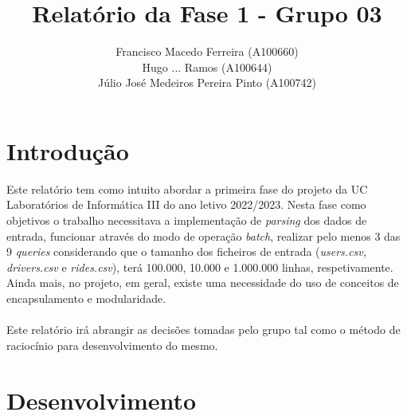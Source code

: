 \documentclass{article}
\title{Relatório da Fase 1 - Grupo 03}
\author{Francisco Macedo Ferreira (A100660)\\Hugo ... Ramos (A100644)\\Júlio José Medeiros Pereira Pinto (A100742)}
\begin{document}
    \maketitle

    \section{Introdução}

    Este relatório tem como intuito abordar a primeira fase do projeto da UC Laboratórios 
    de Informática III do ano letivo 2022/2023.
    Nesta fase como objetivos o trabalho necessitava a implementação de \emph{parsing} dos
    dados de entrada, funcionar através do modo de operação \emph{batch}, 
    realizar pelo menos 3 das 9 \emph{queries} considerando que o 
    tamanho dos ficheiros de entrada 
    (\emph{users.csv, drivers.csv} e \emph{rides.csv}), terá 100.000, 10.000 e 
    1.000.000 linhas, respetivamente. Ainda mais, no projeto, em geral, existe 
    uma necessidade do uso de conceitos de encapsulamento e modularidade.
    \\
    \\Este relatório irá abrangir as decisões tomadas pelo grupo tal como o método de raciocínio para desenvolvimento do mesmo.
    

    \section{Desenvolvimento}
\end{document}
